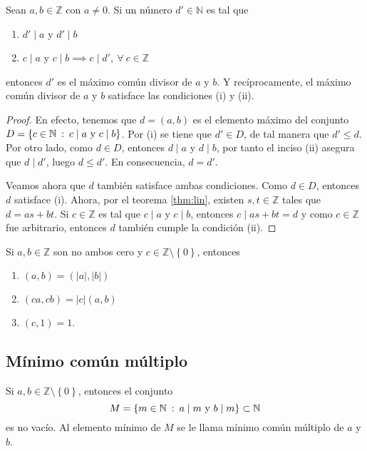 \begin{proposition}
Sean $a,b\in \mathbb{Z}$ con $a\neq 0$. Si un número $d'\in \mathbb{N}$ es tal que 

\begin{enumerate}[label=\textnormal{(\roman*)}]
	\item $d' \mid a$ y $d' \mid b$
	\item $c \mid a$ y $c \mid b \implies c \mid d',\:\forall \: c\in \mathbb{Z}$
\end{enumerate}
entonces $d'$ es el máximo común divisor de $a$ y $b$. Y recíprocamente, el máximo común divisor de $a$ y $b$ satisface las condiciones (i) y (ii).
\end{proposition}
\begin{proof}
En efecto, tenemos que $d=(a,b)$ es el elemento máximo del conjunto $D=\left\{c\in \mathbb{N} \: : \: c \mid a\textnormal{ y }c \mid b\right\}$. Por (i) se tiene que $d'\in D$, de tal manera que $d'\leq d$. Por otro lado, como $d\in D$, entonces $d \mid a$ y $d \mid b$, por tanto el inciso (ii) asegura que $d \mid d'$, luego $d\leq d'$. En consecuencia, $d=d'$.
\bigskip

Veamos ahora que $d$ también satisface ambas condiciones. Como  $d\in D$, entonces $d$ satisface (i). Ahora, por el teorema \eqref{thm:lin}, existen $s,t\in \mathbb{Z}$ tales que $d=a s+ b t$. Si $c\in \mathbb{Z}$ es tal que $c \mid a$ y $c \mid b$, entonces $c \mid a s+b t=d$ y como $c\in \mathbb{Z}$ fue arbitrario, entonces $d$ también cumple la condición (ii).
\end{proof}

\begin{proposition}
Si $a,b\in \mathbb{Z}$ son no ambos cero y $c\in \mathbb{Z}\setminus \left\{0\right\}$, entonces

\begin{enumerate}[label=\textnormal{(\roman*)}]
	\item $(a,b)=(|a|,|b|)$
	\item $(ca,cb)=|c|(a,b)$
	\item $(c,1)=1$. 
\end{enumerate}
\end{proposition}

\subsection{Mínimo común múltiplo}

\begin{proposition}[y definición]\label{prop:mcm1}
Si $a,b\in \mathbb{Z}\setminus \left\{0\right\}$, entonces el conjunto 
\begin{equation*}
	M=\left\{m\in \mathbb{N} \: : \: a \mid m\textnormal{ y }b \mid m\right\}\subset \mathbb{N}
\end{equation*}
es no vacío. Al elemento mínimo de $M$ se le llama mínimo común múltiplo de $a$ y $b$.
\end{proposition}

